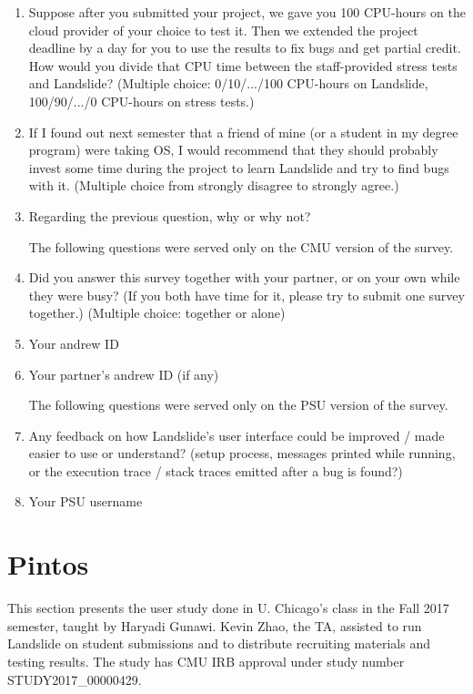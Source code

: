 \begin{enumerate}
	\item Suppose after you submitted your project, %
		we gave you 100 CPU-hours on the cloud provider of your choice to test it. Then we extended the project deadline by a day for you to use the results to fix bugs and get partial credit. How would you divide that CPU time between the staff-provided stress tests and Landslide?
		(Multiple choice: 0/10/.../100 CPU-hours on Landslide, 100/90/.../0 CPU-hours on stress tests.)
	\item If I found out next semester that a friend of mine (or a student in my degree program) were taking OS, I would recommend that they should probably invest some time during the project %
		to learn Landslide and try to find bugs with it.
		(Multiple choice from strongly disagree to strongly agree.)
	\item Regarding the previous question, why or why not?
\vspace{1em}

\noindent The following questions were served only on the CMU version of the survey.
	\item Did you answer this survey together with your partner, or on your own while they were busy? (If you both have time for it, please try to submit one survey together.)
		(Multiple choice: together or alone)
	\item Your andrew ID
	\item Your partner's andrew ID (if any)
\vspace{1em}

\noindent The following questions were served only on the PSU version of the survey.
	\item Any feedback on how Landslide's user interface could be improved / made easier to use or understand? (setup process, messages printed while running, or the execution trace / stack traces emitted after a bug is found?)
	\item Your PSU username
\end{enumerate}


\section{Pintos}

This section presents the user study done in U. Chicago's \uchos class in the Fall 2017 semester,
taught by Haryadi Gunawi.
Kevin Zhao, the TA, assisted to run Landslide on student submissions
and to distribute recruiting materials and testing results.
The study has CMU IRB approval under study number STUDY2017\_00000429.

